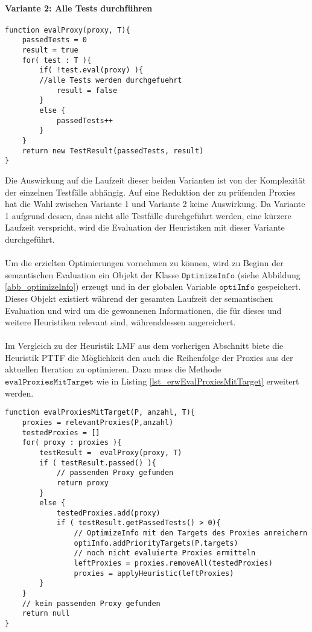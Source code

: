 \documentclass[a4paper,12pt]{article}
\begin{document}
\paragraph{Variante 2: Alle Tests durchführen}


\begin{lstlisting}[style = pseudo,caption = Variante 2: Alle Tests durchführen, captionpos = b]
function evalProxy(proxy, T){
	passedTests = 0
	result = true
	for( test : T ){
		if( !test.eval(proxy) ){
		//alle Tests werden durchgefuehrt
			result = false
		} 
		else {
			passedTests++
		}
	}
	return new TestResult(passedTests, result)
}
\end{lstlisting}\label{lst_PTTFV2}
Die Auswirkung auf die Laufzeit dieser beiden Varianten ist von der Komplexität der einzelnen Testfälle abhängig. Auf eine Reduktion der zu prüfenden Proxies hat die Wahl zwischen Variante 1 und Variante 2 keine Auswirkung. Da Variante 1 aufgrund dessen, dass nicht alle Testfälle durchgeführt werden, eine kürzere Laufzeit verspricht, wird die Evaluation der Heuristiken mit dieser Variante durchgeführt.
\\\\
Um die erzielten Optimierungen vornehmen zu können, wird zu Beginn der semantischen Evaluation ein Objekt der Klasse $\texttt{OptimizeInfo}$ (siehe Abbildung \ref{abb_optimizeInfo}) erzeugt und in der globalen Variable $\texttt{optiInfo}$ gespeichert. Dieses Objekt existiert während der gesamten Laufzeit der semantischen Evaluation und wird um die gewonnenen Informationen, die für dieses und weitere Heuristiken relevant sind, währenddessen angereichert.
\\\\
Im Vergleich zu der Heuristik LMF aus dem vorherigen Abschnitt biete die Heuristik PTTF die Möglichkeit den auch die Reihenfolge der Proxies aus der aktuellen Iteration zu optimieren. Dazu muss die Methode $\texttt{evalProxiesMitTarget}$ wie in Listing \ref{lst_erwEvalProxiesMitTarget} erweitert werden.
\begin{lstlisting}[style = pseudo,caption = Auswertung des Testergebnisses, captionpos = b]
function evalProxiesMitTarget(P, anzahl, T){
	proxies = relevantProxies(P,anzahl)
	testedProxies = []
	for( proxy : proxies ){
		testResult =  evalProxy(proxy, T)
		if ( testResult.passed() ){
			// passenden Proxy gefunden
			return proxy
		}
		else {
			testedProxies.add(proxy)
			if ( testResult.getPassedTests() > 0){
				// OptimizeInfo mit den Targets des Proxies anreichern
				optiInfo.addPriorityTargets(P.targets)
				// noch nicht evaluierte Proxies ermitteln
				leftProxies = proxies.removeAll(testedProxies)
				proxies = applyHeuristic(leftProxies)		
		}
	}
	// kein passenden Proxy gefunden
	return null
}
\end{lstlisting}\label{lst_erwEvalProxiesMitTarget}
\end{document}

